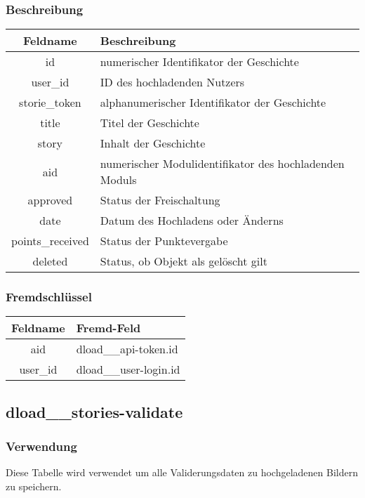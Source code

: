 \subsubsection{Beschreibung}
\begin{table}[H]
	\begin{tabular}{|c|p{12cm}|}
		\hline
		\textbf{Feldname} & \textbf{Beschreibung}\\ \hline
		id & numerischer Identifikator der Geschichte \\ \hline
		user\_id & ID des hochladenden Nutzers \\ \hline
		storie\_token & alphanumerischer Identifikator der Geschichte \\ \hline
		title & Titel der Geschichte \\ \hline
		story & Inhalt der Geschichte \\ \hline
		aid & numerischer Modulidentifikator des hochladenden Moduls \\ \hline
		approved & Status der Freischaltung \\ \hline
		date & Datum des Hochladens oder Änderns \\ \hline
		points\_received & Status der Punktevergabe \\ \hline
		deleted & Status, ob Objekt als gelöscht gilt \\ \hline
	\end{tabular}
\end{table}
\subsubsection{Fremdschlüssel}
\begin{table}[H]
	\begin{tabular}{|c|p{12.5cm}|}
		\hline
		\textbf{Feldname} & \textbf{Fremd-Feld} \\ \hline
		aid & dload\_\_api-token.id \\ \hline
		user\_id & dload\_\_user-login.id \\ \hline
	\end{tabular}
\end{table}
\subsection{dload\_\_stories-validate}
\subsubsection{Verwendung} Diese Tabelle wird verwendet um alle Validerungsdaten zu hochgeladenen Bildern zu speichern.
